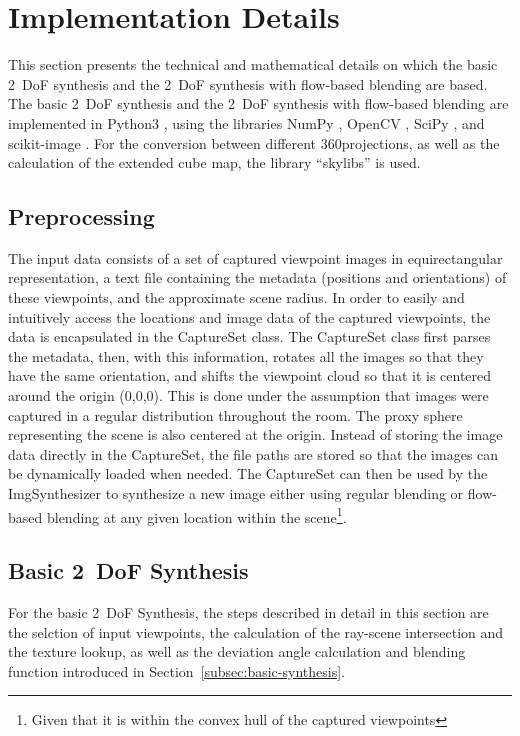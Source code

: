 \section{Implementation Details} \label{sec:impl_details}
This section presents the technical and mathematical details on which the basic 2~DoF synthesis and the 2~DoF synthesis with flow-based blending are based. 
The basic 2~DoF synthesis and the 2~DoF synthesis with flow-based blending are implemented in Python3 \cite{python}, using the libraries NumPy \cite{numpy}, OpenCV \cite{opencv}, SciPy \cite{scipy}, and scikit-image \cite{skimage}. For the conversion between different 360\degree projections, as well as the calculation of the extended cube map, the library ``skylibs'' \cite{skylibs} is used.


\subsection{Preprocessing}
The input data consists of a set of captured viewpoint images in equirectangular representation, a text file containing the metadata (positions and orientations) of these viewpoints, and the approximate scene radius. In order to easily and intuitively access the locations and image data of the captured viewpoints, the data is encapsulated in the CaptureSet class. The CaptureSet class first parses the metadata, then, with this information, rotates all the images so that they have the same orientation, and shifts the viewpoint cloud so that it is centered around the origin (0,0,0). This is done under the assumption that images were captured in a regular distribution throughout the room. The proxy sphere representing the scene is also centered at the origin. Instead of storing the image data directly in the CaptureSet, the file paths are stored so that the images can be dynamically loaded when needed. The CaptureSet can then be used by the ImgSynthesizer to synthesize a new image either using regular blending or flow-based blending at any given location within the scene\footnote{Given that it is within the convex hull of the captured viewpoints}.

\subsection{Basic 2~DoF Synthesis}
For the basic 2~DoF Synthesis, the steps described in detail in this section are the selction of input viewpoints, the calculation of the ray-scene intersection and the texture lookup, as well as the deviation angle calculation and blending function introduced in Section~\ref{subsec:basic-synthesis}.

